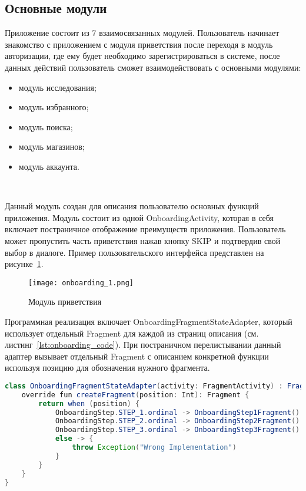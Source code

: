 \subsection{Основные модули}

Приложение состоит из 7 взаимосвязанных модулей. Пользователь начинает знакомство с приложением с модуля приветствия после переходя в модуль авторизации, где ему будет необходимо зарегистрироваться в системе, после данных действий пользователь сможет взаимодействовать с основными модулями:

\begin{itemize}
  \item модуль исследования;
  \item модуль избранного;
  \item модуль поиска;
  \item модуль магазинов;
  \item модуль аккаунта.
\end{itemize}

~\par
Данный модуль создан для описания пользователю основных функций приложения. Модуль состоит из одной OnboardingActivity, которая в себя включает постраничное отображение преимуществ приложения. Пользователь может пропустить часть приветствия нажав кнопку SKIP и подтвердив свой выбор в диалоге. Пример пользовательского интерфейса представлен на рисунке~\ref{fig:arch:onboarding_1}.

\begin{figure}[H]
 \centering
   \texttt{[image: onboarding\_1.png]} 
   \caption{Модуль приветствия}
   \label{fig:arch:onboarding_1}
\end{figure}

Программная реализация включает OnboardingFragmentStateAdapter, который использует отдельный Fragment для каждой из страниц описания (см. листинг~\ref{lst:onboarding_code}). При постраничном перелистывании данный адаптер вызывает отдельный Fragment с описанием конкретной функции используя позицию для обозначения нужного фрагмента.


\begin{lstlisting}[language=Java,label={lst:onboarding_code},caption={OnboardingFragmentStateAdapter}]
class OnboardingFragmentStateAdapter(activity: FragmentActivity) : FragmentStateAdapter(activity) {
    override fun createFragment(position: Int): Fragment {
        return when (position) {
            OnboardingStep.STEP_1.ordinal -> OnboardingStep1Fragment()
            OnboardingStep.STEP_2.ordinal -> OnboardingStep2Fragment()
            OnboardingStep.STEP_3.ordinal -> OnboardingStep3Fragment()
            else -> {
                throw Exception("Wrong Implementation")
            }
        }
    }
}
\end{lstlisting}


